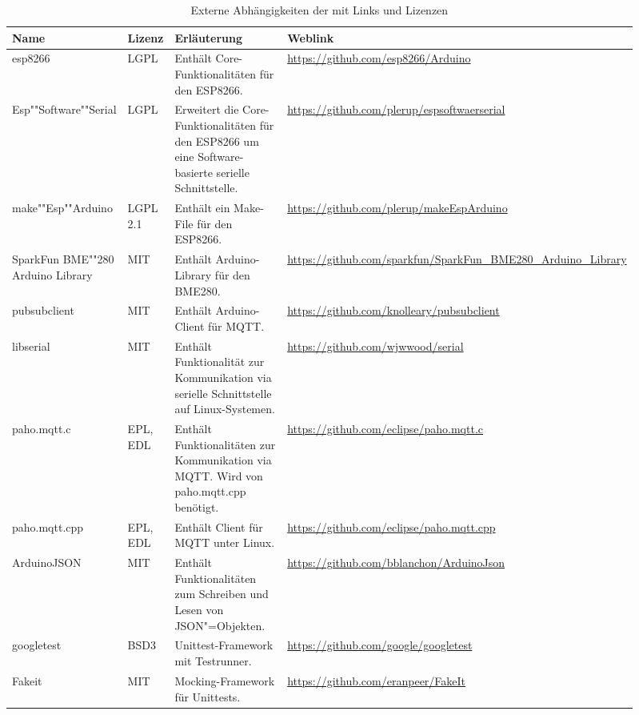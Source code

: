 \begin{landscape}
	


\begin{table}[htb]
	\caption{Externe Abhängigkeiten der \skfw mit Links und Lizenzen}
	\begin{tabular}{|p{0.18\linewidth}|p{0.06\linewidth}|p{0.34\linewidth}|p{0.33\linewidth}|}
		\hline
		Name & Lizenz & Erläuterung & Weblink \\ \hline
		esp8266 & LGPL & Enthält Core-Funktionalitäten für den ESP8266. & \small\url{https://github.com/esp8266/Arduino} \\ \hline
		Esp""Software""Serial & LGPL & Erweitert die Core-Funktionalitäten für den ESP8266 um eine Software-basierte serielle Schnittstelle. & \url{https://github.com/plerup/espsoftwaerserial} \\ \hline
		make""Esp""Arduino & LGPL 2.1 & Enthält ein Make-File für den ESP8266. & \small\url{https://github.com/plerup/makeEspArduino} \\ \hline
		SparkFun BME""280 Arduino Library & MIT & Enthält Arduino-Library für den BME280. & \small\url{https://github.com/sparkfun/SparkFun_BME280_Arduino_Library} \\ \hline
		pubsubclient & MIT & Enthält Arduino-Client für MQTT. & \small\url{https://github.com/knolleary/pubsubclient} \\ \hline
		libserial & MIT & Enthält Funktionalität zur Kommunikation via serielle Schnittstelle auf Linux-Systemen. & \small\url{https://github.com/wjwwood/serial} \\ \hline
		paho.mqtt.c & EPL, EDL & Enthält Funktionalitäten zur Kommunikation via MQTT. Wird von paho.mqtt.cpp benötigt. & \small\url{https://github.com/eclipse/paho.mqtt.c} \\ \hline
		paho.mqtt.cpp & EPL, EDL & Enthält Client für MQTT unter Linux. & \small\url{https://github.com/eclipse/paho.mqtt.cpp} \\ \hline
		ArduinoJSON & MIT & Enthält Funktionalitäten zum Schreiben und Lesen von JSON"=Objekten. & \url{https://github.com/bblanchon/ArduinoJson} \\ \hline
		googletest & BSD3 & Unittest-Framework mit Testrunner. & \small\url{https://github.com/google/googletest} \\ \hline
		Fakeit & MIT & Mocking-Framework für Unittests. & \small\url{https://github.com/eranpeer/FakeIt} \\ \hline
	\end{tabular}
	\label{tbl:skextfwfull}
\end{table}


\end{landscape}
